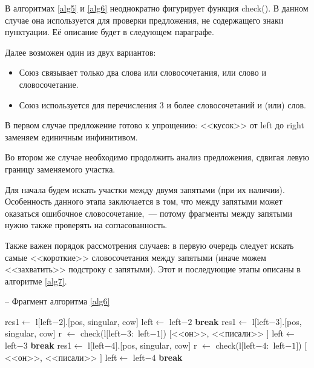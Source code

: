 \documentclass[main]{subfiles}
\begin{document}
В алгоритмах \ref{alg5} и \ref{alg6} неоднократно фигурирует функция check(). В данном случае она используется для проверки предложения, не содержащего знаки пунктуации. Её описание будет в следующем параграфе.

Далее возможен один из двух вариантов:
\begin{itemize}
	\item Союз связывает только два слова или словосочетания, или слово и словосочетание.
	\item Союз используется для перечисления $3$ и более словосочетаний и (или) слов.
\end{itemize}

В первом случае предложение готово к упрощению: <<кусок>> от left до right заменяем единичным инфинитивом.

Во втором же случае необходимо продолжить анализ предложения, сдвигая левую границу заменяемого участка.

Для начала будем искать участки между двумя запятыми (при их наличии). Особенность данного этапа заключается в том, что между запятыми может оказаться ошибочное словосочетание,~--- потому фрагменты между запятыми нужно также проверять на согласованность.

Также важен порядок рассмотрения случаев: в первую очередь следует искать самые <<короткие>> словосочетания между запятыми (иначе можем <<захватить>> подстроку с запятыми). Этот и последующие этапы описаны в алгоритме \ref{alg7}.

\begin{algorithm}
	\caption{-- Фрагмент алгоритма \ref{alg6}}\label{alg7}
	\begin{algorithmic}[1]
	 
	\State res1$\gets$ l$[$left$-2]$.[pos, singular, cow]
	\State left$\gets$ left$-2$
	\State \textbf{break}
	\EndIf
	\EndFor
	 
	\State  res1$\gets$ l$[$left$-3]$.[pos, singular, cow]
	\State r $\gets$ check(l$[$left$-3:$ left$-1 ]$)
	\State \Return $[$<<он>>, <<писали>> $]$
	\State left$\gets$ left$-3$
	\State \textbf{break}
	\EndIf
	\EndIf
	\EndFor
	\State  res1$\gets$ l$[$left$-4]$.[pos, singular, cow]
	\State r $\gets$ check(l$[$left$-4:$ left$-1 ]$)
	\State \Return $[$<<он>>, <<писали>> $]$
	\State left$\gets$ left$-4$
	\State \textbf{break}
	\end{algorithmic}
	\end{algorithm}
\end{document}
